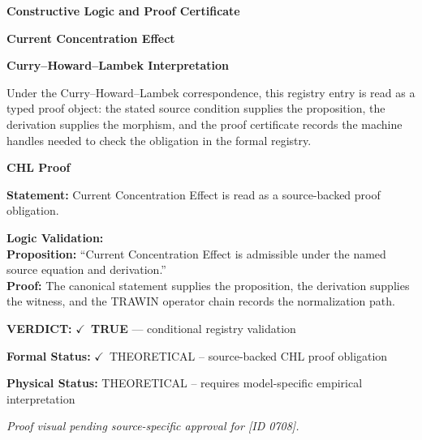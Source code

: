 \clearpage
\begingroup\tzpsupportsetup
\noindent\textbf{\fontsize{10.8pt}{12.8pt}\selectfont [ID 0708] Constructive Logic and Proof Certificate}\par
\noindent\textbf{\fontsize{10pt}{12pt}\selectfont Current Concentration Effect}\par
\vspace{0.45em}
\begingroup
\footnotesize
\setlength{\parskip}{0.22em}
\setlength{\parindent}{0pt}
\noindent\textbf{Curry--Howard--Lambek Interpretation}\par
Under the Curry--Howard--Lambek correspondence, this registry entry is read as a typed proof
object: the stated source condition supplies the proposition, the derivation supplies the
morphism, and the proof certificate records the machine handles needed to check the obligation
in the formal registry.

\vspace{0.45em}
\noindent\textbf{CHL Proof}\par
\textbf{Statement:} Current Concentration Effect is read as a source-backed proof obligation.

\textbf{Logic Validation:}\\
\textbf{Proposition:} ``Current Concentration Effect is admissible under the named source equation and derivation.''\\
\textbf{Proof:} The canonical statement supplies the proposition, the derivation supplies the witness, and the TRAWIN operator chain records the normalization path.

\textbf{VERDICT:} \ensuremath{\checkmark}\ \textbf{TRUE} --- conditional registry validation

\textbf{Formal Status:} \ensuremath{\checkmark}\ THEORETICAL -- source-backed CHL proof obligation

\textbf{Physical Status:} THEORETICAL -- requires model-specific empirical interpretation
\par\vspace{0.45em}
\par
\vfill
\begingroup\footnotesize\itshape
Proof visual pending source-specific approval for [ID 0708].
\par\endgroup
\vfill
\endgroup
\endgroup
